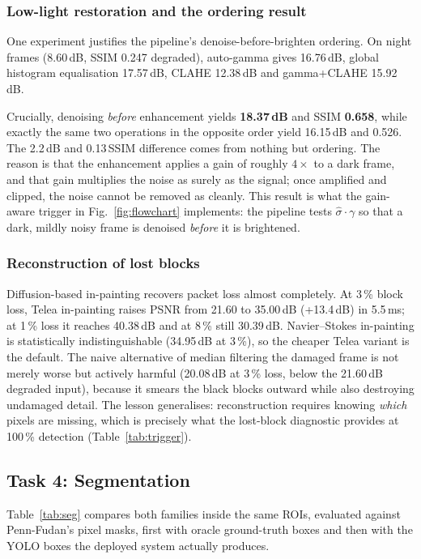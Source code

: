 \documentclass[conference,10pt]{IEEEtran}
\begin{document}
\subsubsection{Low-light restoration and the ordering result}
One experiment justifies the pipeline's denoise-before-brighten ordering. On
night frames (8.60\,dB, SSIM 0.247 degraded), auto-gamma gives 16.76\,dB,
global histogram equalisation 17.57\,dB, CLAHE 12.38\,dB and gamma+CLAHE
15.92\,dB.

Crucially, denoising \emph{before} enhancement yields \textbf{18.37\,dB} and
SSIM \textbf{0.658}, while exactly the same two operations in the opposite
order yield 16.15\,dB and 0.526. The 2.2\,dB and 0.13\,SSIM difference comes
from nothing but ordering.
The reason is that the enhancement applies a gain of roughly $4\times$ to a
dark frame, and that gain multiplies the noise as surely as the signal; once
amplified and clipped, the noise cannot be removed as cleanly. This result is
what the gain-aware trigger in Fig.~\ref{fig:flowchart} implements: the
pipeline tests $\hat\sigma\cdot\gamma$ so that a dark, mildly noisy frame is
denoised \emph{before} it is brightened.

\subsubsection{Reconstruction of lost blocks}
Diffusion-based in-painting recovers packet loss almost completely. At 3\,\%
block loss, Telea in-painting raises PSNR from 21.60 to 35.00\,dB (+13.4\,dB)
in 5.5\,ms; at 1\,\% loss it reaches 40.38\,dB and at 8\,\% still 30.39\,dB.
Navier--Stokes in-painting is statistically indistinguishable (34.95\,dB at
3\,\%), so the cheaper Telea variant is the default. The naive alternative of
median filtering the damaged frame is not merely worse but actively harmful
(20.08\,dB at 3\,\% loss, below the 21.60\,dB degraded input), because it
smears the black blocks outward while also destroying undamaged detail. The
lesson generalises: reconstruction requires knowing \emph{which} pixels are
missing, which is precisely what the lost-block diagnostic provides at 100\,\%
detection (Table~\ref{tab:trigger}).

\subsection{Task 4: Segmentation}\label{sec:res-seg}
Table~\ref{tab:seg} compares both families inside the same ROIs, evaluated
against Penn-Fudan's pixel masks, first with oracle ground-truth boxes and then
with the YOLO boxes the deployed system actually produces.
\end{document}
